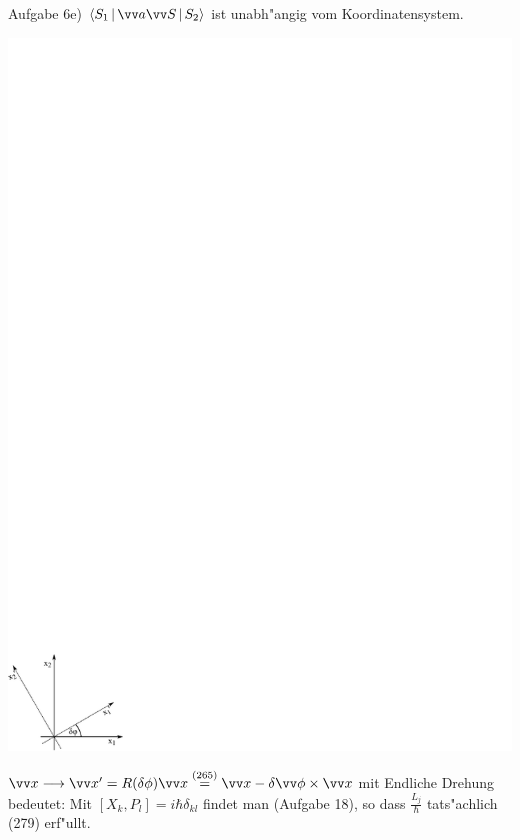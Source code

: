 \documentclass[a4paper]{scrartcl}
\begin{document}
{Aufgabe 6e) $\Braket{ S_1 | \vv a \vv S | S_2 }$ ist unabh"angig vom Koordinatensystem.
\begin{center}
\includegraphics{283Drehung}
\end{center}
$\vv x \longrightarrow \vv x ' = R( \delta \phi) \vv x \stackrel{(265)}= \vv x - \delta \vv \phi \times \vv x$
mit
Endliche Drehung
bedeutet:
Mit $[X_k, P_l] = i \hbar \delta_{kl}$ findet man
(Aufgabe 18), so dass $\frac{L_j}\hbar$ tats"achlich (279) erf"ullt.

}
\end{document}
